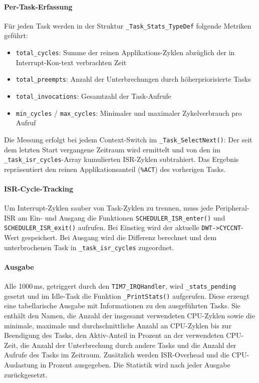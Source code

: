 \paragraph{Per-Task-Erfassung}
Für jeden Task werden in der Struktur \texttt{\_Task\_Stats\_TypeDef} folgende Metriken geführt:
\begin{itemize}
    \item \texttt{total\_cycles}: Summe der reinen Applikations-Zyklen abzüglich der in Interrupt-Kon-text verbrachten Zeit
    \item \texttt{total\_preempts}: Anzahl der Unterbrechungen durch höherpriorisierte Tasks
    \item \texttt{total\_invocations}: Gesamtzahl der Task-Aufrufe
    \item \texttt{min\_cycles} / \texttt{max\_cycles}: Minimaler und maximaler Zykelverbrauch pro Aufruf
\end{itemize}
Die Messung erfolgt bei jedem Context-Switch im \texttt{\_Task\_SelectNext()}: Der seit dem letzten Start vergangene Zeitraum wird ermittelt und von den im \texttt{\_task\_isr\_cycles}-Array kumulierten ISR-Zyklen subtrahiert. Das Ergebnis repräsentiert den reinen Applikationsanteil (\texttt{\%ACT}) des vorherigen Tasks.

\paragraph{ISR-Cycle-Tracking}
Um Interrupt-Zyklen sauber von Task-Zyklen zu trennen, muss jede Peripheral-ISR am Ein- und Ausgang die Funktionen \texttt{SCHEDULER\_ISR\_enter()} und \linebreak \texttt{SCHEDULER\_ISR\_exit()} aufrufen. Bei Einstieg wird der aktuelle \texttt{DWT->CYCCNT}-Wert gespeichert. Bei Ausgang wird die Differenz berechnet und dem unterbrochenen Task in \linebreak \texttt{\_task\_isr\_cycles} zugeordnet.

\paragraph{Ausgabe}
Alle 1000\,ms, getriggert durch den \texttt{TIM7\_IRQHandler}, wird \texttt{\_stats\_pending} gesetzt und im Idle-Task die Funktion \texttt{\_PrintStats()} aufgerufen. Diese erzeugt eine tabellarische Ausgabe mit Informationen zu den ausgeführten Tasks. Sie enthält den Namen, die Anzahl der insgesamt verwendeten CPU-Zyklen sowie die minimale, maximale und durchschnittliche Anzahl an CPU-Zyklen bis zur Beendigung des Tasks, den Aktiv-Anteil in Prozent an der verwendeten CPU-Zeit, die Anzahl der Unterbrechung durch andere Tasks und die Anzahl der Aufrufe des Tasks im Zeitraum. Zusätzlich werden ISR-Overhead und die CPU-Auslastung in Prozent ausgegeben. Die Statistik wird nach jeder Ausgabe zurückgesetzt.

